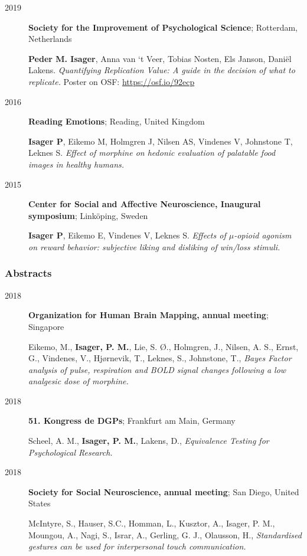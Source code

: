 \documentclass[]{article}
\begin{document}
\begin{description}
\item[2019]
\textbf{Society for the Improvement of Psychological Science};
Rotterdam, Netherlands

\textbf{Peder M. Isager}, Anna van `t Veer, Tobias Nosten, Els Janson,
Daniël Lakens. \emph{Quantifying Replication Value: A guide in the
decision of what to replicate.} Poster on OSF:
\url{https://osf.io/92ecp}
\item[2016]
\textbf{Reading Emotions}; Reading, United Kingdom

\textbf{Isager P}, Eikemo M, Holmgren J, Nilsen AS, Vindenes V,
Johnstone T, Leknes S. \emph{Effect of morphine on hedonic evaluation of
palatable food images in healthy humans.}
\item[2015]
\textbf{Center for Social and Affective Neuroscience, Inaugural
symposium}; Linköping, Sweden

\textbf{Isager P}, Eikemo E, Vindenes V, Leknes S. \emph{Effects of
\(\mu\)-opioid agonism on reward behavior: subjective liking and
disliking of win/loss stimuli.}
\end{description}

\subsubsection{Abstracts}\label{abstracts}

\begin{description}
\item[2018]
\textbf{Organization for Human Brain Mapping, annual meeting}; Singapore

Eikemo, M., \textbf{Isager, P. M.}, Lie, S. Ø., Holmgren, J., Nilsen, A.
S., Ernst, G., Vindenes, V., Hjørnevik, T., Leknes, S., Johnstone, T.,
\emph{Bayes Factor analysis of pulse, respiration and BOLD signal
changes following a low analgesic dose of morphine.}
\item[2018]
\textbf{51. Kongress de DGPs}; Frankfurt am Main, Germany

Scheel, A. M., \textbf{Isager, P. M.}, Lakens, D., \emph{Equivalence
Testing for Psychological Research.}
\item[2018]
\textbf{Society for Social Neuroscience, annual meeting}; San Diego,
United States

McIntyre, S., Hauser, S.C., Homman, L., Kusztor, A., Isager, P. M.,
Moungou, A., Nagi, S., Israr, A., Gerling, G. J., Olausson, H.,
\emph{Standardised gestures can be used for interpersonal touch
communication.}
\end{description}
\end{document}
